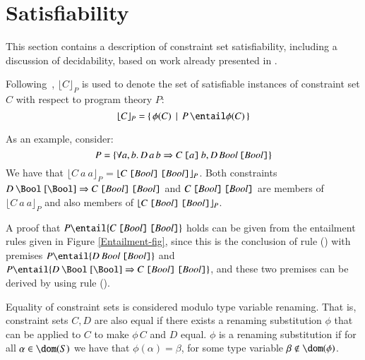 \documentclass[review]{elsarticle}
\begin{document}
% 

% 

\section{Satisfiability}
\label{Satisfiability}

This section contains a description of constraint set satisfiability,
including a discussion of decidability, based on work already
presented in \cite{Ambiguity-and-context-dependent-overloading}.

Following~\cite{MarkJonesImprovement}, $\lfloor C \rfloor_P$ is used
to denote the set of satisfiable instances of constraint set $C$ with
respect to program theory $P$:
  \[ \lfloor C \rfloor_P = \{\,\phi(C) \,\mid\, P\, \entail \phi(C)\, \} \]

\begin{Example} {\rm
As an example, consider:
  \[ P = \{ \forall a,b.\,D\, a\,
             b\Rightarrow C\, \text{\tt{[$a$]}}\, b, D\, \text{\it Bool\/}\,
             \text{\tt {[{\it Bool\/}]}}\}\]
We have that
  $\lfloor C\:a\:a\rfloor_P$ =
  $\lfloor C\:\text{\tt{[\it Bool\/}]}\: \text{\tt{[\it Bool\/}]}\rfloor_P$.
Both constraints
  $D\:\text{\Bool\ [\Bool]} \Rightarrow C\:\text{\tt{[{\it Bool\/}]}}\: \text{\tt [{\it Bool\/}]}$
and
  $C\:\text{\tt{[{\it Bool\/}]}}\: \text{\tt [{\it Bool\/}]}$
are members of
  $\lfloor C\:a\:a\rfloor_P$ and also members of
  $\lfloor C\:\text{\tt{[\it Bool\/}]}\: \text{\tt{[\it Bool\/}]}\rfloor_P$.

A proof that $P \entail \{ C\:\text{\tt{[\it Bool\/}]}\: \text{\tt{[\it Bool\/}]} \}$
holds can be given from the entailment rules given in Figure \ref{Entailment-fig},
since this is the conclusion of rule (\entmp) with premises
  $P \entail \{ D\:\text{\it Bool\/}\: \text{\tt{[\it Bool\/}]} \}$ and
  $P \entail \{ D\:\text{\Bool\ [\Bool]} \Rightarrow C\:\text{\tt{[{\it Bool\/}]}}
                                                                               \:\text{\tt{[{\it Bool\/}]}}\}$,
and these two premises can be derived by using rule (\entinst).}

\end{Example}

Equality of constraint sets is considered modulo type variable
renaming. That is, constraint sets $C,D$ are also equal if there
exists a renaming substitution $\phi$ that can be applied to $C$ to
make $\phi\,C$ and $D$ equal. $\phi$ is a renaming substitution if for
all $\alpha\in\dom(S)$ we have that $\phi(\alpha)=\beta$, for some
type variable $\beta\not\in\dom(\phi)$.
\end{document}
